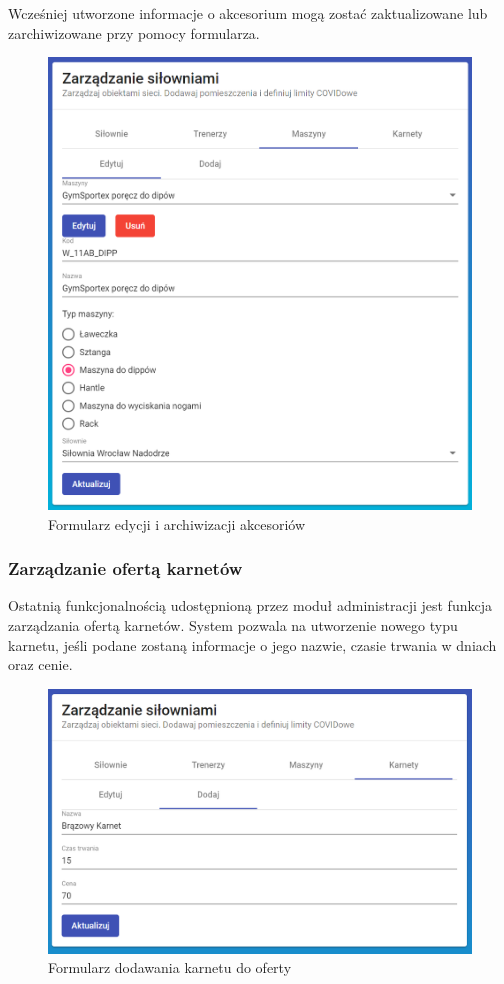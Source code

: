 \documentclass[a4paper,twoside,12pt]{book}
\begin{document}
{Wcześniej utworzone informacje o akcesorium mogą zostać zaktualizowane lub zarchiwizowane przy pomocy formularza.
\begin{figure}[h!]
	\centering
	\includegraphics[width=1\linewidth]{../zrzuty_ekranu/dzialanie/akcesoria/aktualizacja_akcesorium}
	\caption{Formularz edycji i archiwizacji akcesoriów}
	\label{fig:aktualizacjaakcesorium}
\end{figure}
\FloatBarrier

\subsubsection{Zarządzanie ofertą karnetów}
Ostatnią funkcjonalnością udostępnioną przez moduł administracji jest funkcja zarządzania ofertą karnetów. System pozwala na utworzenie nowego typu karnetu, jeśli podane zostaną informacje o jego nazwie, czasie trwania w dniach oraz cenie.
\begin{figure}[h!]
	\centering
	\includegraphics[width=0.8\linewidth]{../zrzuty_ekranu/dzialanie/karnety/tworzenie_karnetu}
	\caption{Formularz dodawania karnetu do oferty}
	\label{fig:tworzeniekarnetu}
\end{figure}
\FloatBarrier

}
\end{document}
